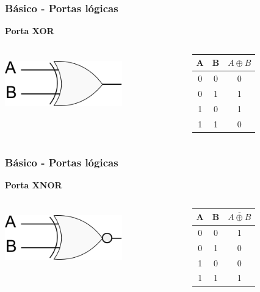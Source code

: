 \documentclass{beamer}
\begin{document}
\begin{frame}
  \frametitle{Básico - Portas lógicas}
\begin{center}
   \textbf{\huge{Porta XOR}} 
   \begin{columns}[c]
   \begin{column}{5cm}
    \includegraphics[height = 1in, width = 2in]{xor.png}
   \end{column}\pause
   \begin{column}{5cm}
    \begin{tabular}{|c|c|c|}
     \hline
     A & B & $A \oplus B$ \\
     \hline	
     0 & 0 & 0 \\
     0 & 1 & 1 \\
     1 & 0 & 1 \\
     1 & 1 & 0 \\ 
     \hline
    \end{tabular}
   \end{column}

  \end{columns}
\end{center}
\end{frame}

\begin{frame}
  \frametitle{Básico - Portas lógicas}
\begin{center}
   \textbf{\huge{Porta XNOR}}
   \begin{columns}[c]
   \begin{column}{5cm}
    \includegraphics[height = 1in, width = 2in]{xnor.png}
   \end{column}\pause
   \begin{column}{5cm}
    \begin{tabular}{|c|c|c|}
     \hline
     A & B & $\overline{A \oplus B}$ \\
     \hline	
     0 & 0 & 1 \\
     0 & 1 & 0 \\
     1 & 0 & 0 \\
     1 & 1 & 1 \\ 
     \hline
    \end{tabular}
   \end{column}

  \end{columns}
\end{center}
\end{frame}
\end{document}

